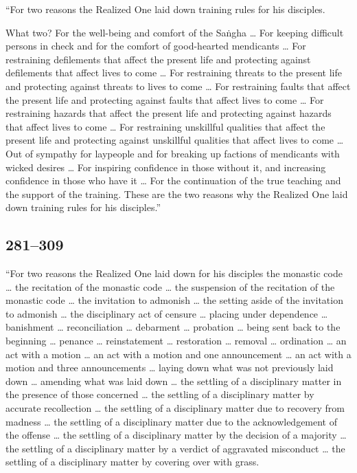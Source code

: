\documentclass[12pt,openany]{book}%
\begin{document}
“For two reasons the Realized One laid down training rules for his disciples. 

What two? For the well-being and comfort of the \textsanskrit{Saṅgha} … For keeping difficult persons in check and for the comfort of good-hearted mendicants … For restraining defilements that affect the present life and protecting against defilements that affect lives to come … For restraining threats to the present life and protecting against threats to lives to come … For restraining faults that affect the present life and protecting against faults that affect lives to come … For restraining hazards that affect the present life and protecting against hazards that affect lives to come … For restraining unskillful qualities that affect the present life and protecting against unskillful qualities that affect lives to come … Out of sympathy for laypeople and for breaking up factions of mendicants with wicked desires … For inspiring confidence in those without it, and increasing confidence in those who have it … For the continuation of the true teaching and the support of the training. These are the two reasons why the Realized One laid down training rules for his disciples.” 

\subsection*{281–309 }

“For two reasons the Realized One laid down for his disciples the monastic code … the recitation of the monastic code … the suspension of the recitation of the monastic code … the invitation to admonish … the setting aside of the invitation to admonish … the disciplinary act of censure … placing under dependence … banishment … reconciliation … debarment … probation … being sent back to the beginning … penance … reinstatement … restoration … removal … ordination … an act with a motion … an act with a motion and one announcement … an act with a motion and three announcements … laying down what was not previously laid down … amending what was laid down … the settling of a disciplinary matter in the presence of those concerned … the settling of a disciplinary matter by accurate recollection … the settling of a disciplinary matter due to recovery from madness … the settling of a disciplinary matter due to the acknowledgement of the offense … the settling of a disciplinary matter by the decision of a majority … the settling of a disciplinary matter by a verdict of aggravated misconduct … the settling of a disciplinary matter by covering over with grass. 
\end{document}
